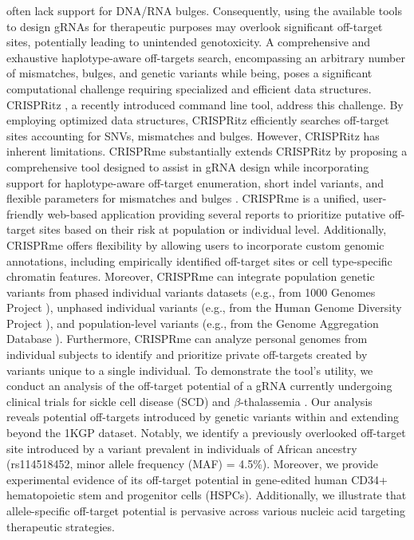 \documentclass[a4paper, titlepage, openright]{book}
\newcommand{\crisprme}{CRISPRme\xspace}
\begin{document}
often lack support for DNA/RNA bulges. Consequently, using the available tools to design gRNAs for therapeutic purposes may overlook significant off-target sites, potentially leading to unintended genotoxicity. A comprehensive and exhaustive haplotype-aware off-targets search, encompassing an arbitrary number of mismatches, bulges, and genetic variants while being, poses a significant computational challenge requiring specialized and efficient data structures. CRISPRitz \citep{cancellieri2020crispritz}, a recently introduced command line tool, address this challenge. By employing optimized data structures, CRISPRitz efficiently searches off-target sites accounting for SNVs, mismatches and bulges. However, CRISPRitz has inherent limitations. \crisprme substantially extends CRISPRitz by proposing a comprehensive tool designed to assist in gRNA design while incorporating support for haplotype-aware off-target enumeration, short indel variants, and flexible parameters for mismatches and bulges \citep{cancellieri2023human}. \crisprme is a unified, user-friendly web-based application providing several reports to prioritize putative off-target sites based on their risk at population or individual level. Additionally, \crisprme offers flexibility by allowing users to incorporate custom genomic annotations, including empirically identified off-target sites or cell type-specific chromatin features. Moreover, \crisprme can integrate population genetic variants from phased individual variants datasets (e.g., from 1000 Genomes Project \citep{10002015global,lowy2019variant}), unphased individual variants (e.g., from the Human Genome Diversity Project \citep{bergstrom2020insights}), and population-level variants (e.g., from the Genome Aggregation Database \citep{karczewski2020mutational}). Furthermore, \crisprme can analyze personal genomes from individual subjects to identify and prioritize private off-targets created by variants unique to a single individual. To demonstrate the tool's utility, we conduct an analysis of the off-target potential of a gRNA currently undergoing clinical trials for sickle cell disease (SCD) and $\beta$-thalassemia \citep{frangoul2021crispr, canver2015bcl11a, wu2019highly}. Our analysis reveals potential off-targets introduced by genetic variants within and extending beyond the 1KGP dataset. Notably, we identify a previously overlooked off-target site introduced by a variant prevalent in individuals of African ancestry (rs114518452, minor allele frequency (MAF) = 4.5\%). Moreover, we provide experimental evidence of its off-target potential in gene-edited human CD34+ hematopoietic stem and progenitor cells (HSPCs). Additionally, we illustrate that allele-specific off-target potential is pervasive across various nucleic acid targeting therapeutic strategies.
\end{document}
